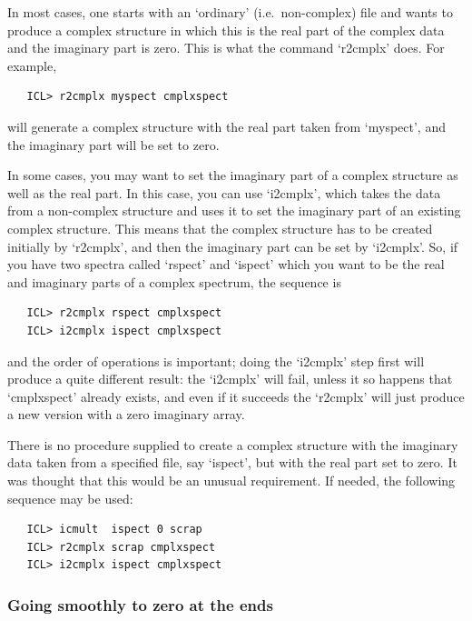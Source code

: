 \documentclass[11pt,twoside]{article}
\begin{document}
   In most cases, one starts with an `ordinary' (i.e.\ non-complex) file
   and wants to produce a complex structure in which this is the real
   part of the complex data and the imaginary part is zero.  This is
   what the command `r2cmplx' does.  For example,

\begin{verbatim}
   ICL> r2cmplx myspect cmplxspect
\end{verbatim}

   will generate a complex structure with the real part taken from
   `myspect', and the imaginary part will be set to zero.

   In some cases, you may want to set the imaginary part of a complex
   structure as well as the real part.  In this case, you can use
   `i2cmplx', which takes the data from a non-complex structure and uses
   it to set the imaginary part of an existing complex structure.  This
   means that the complex structure has to be created initially by
   `r2cmplx', and then the imaginary part can be set by `i2cmplx'. So,
   if you have two spectra called `rspect' and `ispect' which you want
   to be the real and imaginary parts of a complex spectrum, the
   sequence is

\begin{verbatim}
   ICL> r2cmplx rspect cmplxspect
   ICL> i2cmplx ispect cmplxspect
\end{verbatim}

   and the order of operations is important; doing the `i2cmplx' step
   first will produce a quite different result: the `i2cmplx' will fail,
   unless it so happens that `cmplxspect' already exists, and even if it
   succeeds the `r2cmplx' will just produce a new version with a zero
   imaginary array.

   There is no procedure supplied to create a complex structure with
   the imaginary data taken from a specified file, say `ispect', but
   with the real part set to zero.  It was thought that this would be an
   unusual requirement.  If needed, the following sequence may be used:

\begin{verbatim}
   ICL> icmult  ispect 0 scrap
   ICL> r2cmplx scrap cmplxspect
   ICL> i2cmplx ispect cmplxspect
\end{verbatim}


\subsubsection{\label{techno6zeroedge}Going smoothly to zero at the ends}
\end{document}

